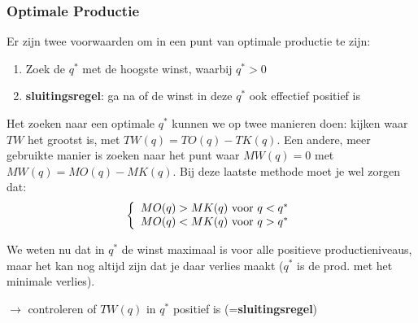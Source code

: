 \subsubsection{Optimale Productie}
Er zijn twee voorwaarden om in een punt van optimale productie te zijn:
\begin{enumerate}
	\item Zoek de $q^*$ met de hoogste winst, waarbij $q^* > 0$
    \item \textbf{sluitingsregel}: ga na of de winst in deze $q^*$ ook effectief positief is
\end{enumerate}

Het zoeken naar een optimale $q^*$ kunnen we op twee manieren doen: kijken waar $TW$ het grootst is, met $ TW(q) = TO(q) - TK(q)$. Een andere, meer gebruikte manier is zoeken naar het punt waar $MW(q) = 0$ met $MW(q) = MO(q) - MK(q)$. Bij deze laatste methode moet je wel zorgen dat:
\begin{equation}
	\left \{\begin{array}{l l}
    MO(q) > MK(q) \text{ voor } q < q^*\\
    MO(q) < MK(q) \text{ voor } q > q^*
  \end{array} \right.
\end{equation}

We weten nu dat in $q^*$ de winst maximaal is voor alle positieve productieniveaus, maar het kan nog altijd zijn dat je daar verlies maakt ($q^*$ is de prod. met het minimale verlies).

$\rightarrow$ controleren of $TW(q)$ in $q^*$ positief is (=\textbf{sluitingsregel})



